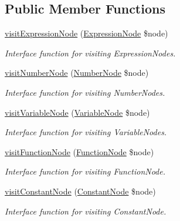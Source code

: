\subsection*{Public Member Functions}
\begin{DoxyCompactItemize}
\item 
\hyperlink{classMathParser_1_1Interpreting_1_1TreePrinter_a5d879664f70352a684d925d0225589d3}{visit\-Expression\-Node} (\hyperlink{classMathParser_1_1Parsing_1_1Nodes_1_1ExpressionNode}{Expression\-Node} \$node)
\begin{DoxyCompactList}\small\item\em Interface function for visiting Expression\-Nodes. \end{DoxyCompactList}\item 
\hyperlink{classMathParser_1_1Interpreting_1_1TreePrinter_aff9bf4ad6fc5ea711b23d39b60f0235c}{visit\-Number\-Node} (\hyperlink{classMathParser_1_1Parsing_1_1Nodes_1_1NumberNode}{Number\-Node} \$node)
\begin{DoxyCompactList}\small\item\em Interface function for visiting Number\-Nodes. \end{DoxyCompactList}\item 
\hyperlink{classMathParser_1_1Interpreting_1_1TreePrinter_a9fa160448c7e0a16e907c79c8d3e4f38}{visit\-Variable\-Node} (\hyperlink{classMathParser_1_1Parsing_1_1Nodes_1_1VariableNode}{Variable\-Node} \$node)
\begin{DoxyCompactList}\small\item\em Interface function for visiting Variable\-Nodes. \end{DoxyCompactList}\item 
\hyperlink{classMathParser_1_1Interpreting_1_1TreePrinter_ae5fc098c679ae4e30030bc0a22d621d0}{visit\-Function\-Node} (\hyperlink{classMathParser_1_1Parsing_1_1Nodes_1_1FunctionNode}{Function\-Node} \$node)
\begin{DoxyCompactList}\small\item\em Interface function for visiting Function\-Node. \end{DoxyCompactList}\item 
\hyperlink{classMathParser_1_1Interpreting_1_1TreePrinter_af2b9784abe53d0fa5ddb75528d1a7e8f}{visit\-Constant\-Node} (\hyperlink{classMathParser_1_1Parsing_1_1Nodes_1_1ConstantNode}{Constant\-Node} \$node)
\begin{DoxyCompactList}\small\item\em Interface function for visiting Constant\-Node. \end{DoxyCompactList}\end{DoxyCompactItemize}


